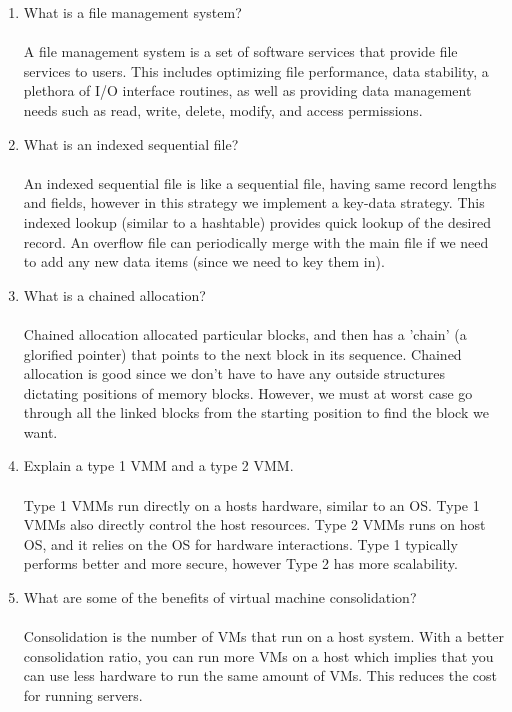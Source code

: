 \documentclass[12pt]{article}
\begin{document}
\begin{enumerate}
	\item What is a file management system?  \\ \\
	A file management system is a set of software services that provide file services to users. This includes optimizing file performance, data stability, a plethora of I/O interface routines, as well as providing data management needs such as read, write, delete, modify, and access permissions.\\
	
	\item What is an indexed sequential file? \\ \\
	An indexed sequential file is like a sequential file, having same record lengths and fields, however in this strategy we implement a key-data strategy. This indexed lookup (similar to a hashtable) provides quick lookup of the desired record. An overflow file can periodically merge with the main file if we need to add any new data items (since we need to key them in).\\
	
	\item What is a chained allocation? \\ \\
	Chained allocation allocated particular blocks, and then has a 'chain' (a glorified pointer) that points to the next block in its sequence. Chained allocation is good since we don't have to have any outside structures dictating positions of memory blocks. However, we must at worst case go through all the linked blocks from the starting position to find the block we want.\\
	
	\item Explain a type 1 VMM and a type 2 VMM. \\ \\
	Type 1 VMMs run directly on a hosts hardware, similar to an OS. Type 1 VMMs also directly control the host resources. Type 2 VMMs runs on host OS, and it relies on the OS for hardware interactions. Type 1 typically performs better and more secure, however Type 2 has more scalability.\\
	
	\item What are some of the benefits of virtual machine consolidation? \\ \\ 
	Consolidation is the number of VMs that run on a host system. With a better consolidation ratio, you can run more VMs on a host which implies that you can use less hardware to run the same amount of VMs. This reduces the cost for running servers.\\
	

\end{enumerate}
\end{document}
